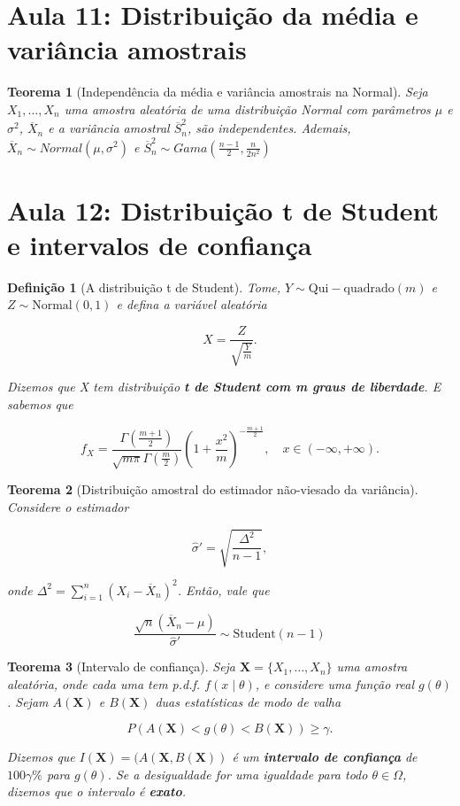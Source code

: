 \documentclass{article}
\newtheorem{theorem}{Teorema}
\newtheorem{definition}{Definição}
\begin{document}
\section*{Aula 11: Distribuição da média e variância amostrais}
\label{s11}
\begin{theorem}[Independência da média e variância amostrais na Normal]
Seja $X_1, \ldots, X_n$ uma amostra aleatória de uma distribuição Normal com parâmetros $\mu$ e $\sigma^2$, $\overline{X}_n$ e a variância amostral $\overline{S}_n^2$, são independentes. Ademais, $\overline{X}_n \sim Normal \left ( \mu, \sigma^2 \right )$ e $\overline{S}_n^2 \sim Gama \left ( \frac{n - 1}{2}, \frac{n}{2 n^2} \right )$
\end{theorem}

\section*{Aula 12: Distribuição t de Student  e intervalos de confiança}
\label{s12}
\begin{definition}[A distribuição t de Student]
Tome, $Y \sim \mathrm{Qui-quadrado}(m)$ e $Z \sim \mathrm{Normal}(0, 1)$ e defina a variável aleatória

$$X = \frac{Z}{\sqrt{\frac{Y}{m}}}.$$

Dizemos que X tem distribuição \textbf{t de Student com m graus de liberdade}. E sabemos que

$$f_X = \frac{\Gamma(\frac{m + 1}{2})}{\sqrt{m \pi} \Gamma(\frac{m}{2})} \left ( 1 + \frac{x^2}{m} \right )^{-\frac{m + 1}{2}}, \quad x \in (-\infty, + \infty).$$
\end{definition}

\begin{theorem}[Distribuição amostral do estimador não-viesado da variância]

Considere o estimador

$$\hat{\sigma}' = \sqrt{\frac{\Delta^2}{n - 1}},$$

onde $\Delta^2 = \sum_{i = 1}^n (X_i - \overline{X}_n)^2$. Então, vale que

$$\frac{\sqrt{n} (\overline{X}_n - \mu)}{\hat{\sigma}'} \sim \mathrm{Student}(n - 1)$$
\end{theorem}

\begin{theorem}[Intervalo de confiança]
Seja $\textbf{X} = \{ X_1, \ldots, X_n \}$ uma amostra aleatória, onde cada uma tem p.d.f. $f(x \mid \theta)$, e considere uma função real $g(\theta)$. Sejam $A(\textbf{X})$ e $B(\textbf{X})$ duas estatísticas de modo de valha

\begin{equation}
    P(A(\textbf{X}) < g(\theta) < B(\textbf{X})) \geq \gamma.
\end{equation}

Dizemos que $I(\textbf{X}) = (A(\textbf{X},B(\textbf{X}))$ é um \textbf{intervalo de confiança} de $100 \gamma \%$ para $g(\theta)$. Se a desigualdade for uma igualdade para todo $\theta \in \Omega$, dizemos que o intervalo é \textbf{exato}.
\end{theorem}
\end{document}
